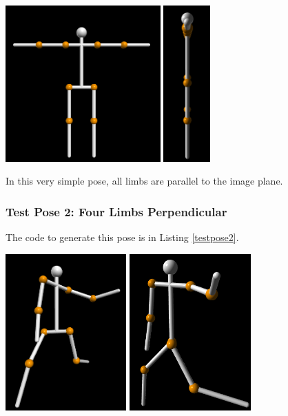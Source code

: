 \documentclass[final]{article}
\begin{document}
\begin{spacing}{1.1}
\begin{center}
  \includegraphics[height=6cm]{fig/testpose1.png}
  \includegraphics[height=6cm]{fig/testposeside1.png}
\end{center}

In this very simple pose, all limbs are parallel to the image plane.

\subsubsection{Test Pose 2: Four Limbs Perpendicular}

The code to generate this pose is in Listing \ref{testpose2}. 

\begin{center}
  \includegraphics[height=6cm]{fig/testpose2.png}
  \includegraphics[height=6cm]{fig/testposeside2.png}
\end{center}


\end{spacing}
\end{document}
